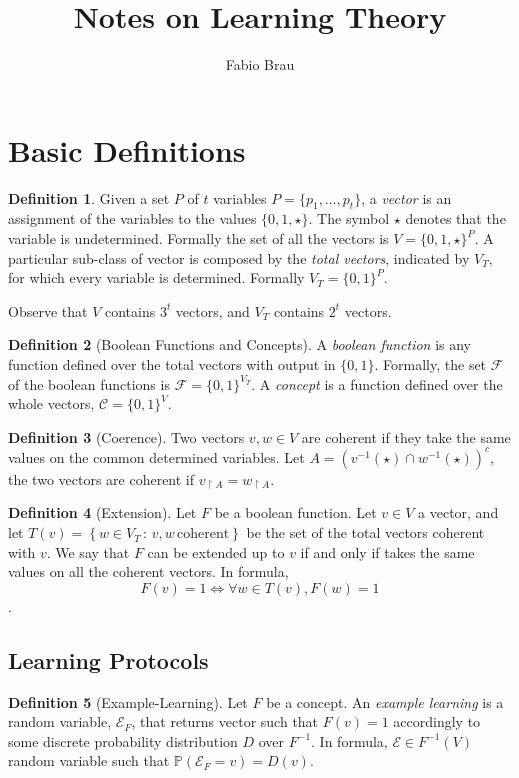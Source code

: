 \documentclass[a4paper,11pt]{article}
\author{Fabio Brau}
\title{Notes on Learning Theory}
\theoremstyle{definition}
\newtheorem{defn}{Definition}
\begin{document}
\maketitle
\tableofcontents
\section{Basic Definitions}
\begin{defn}
  Given a set $P$ of $t$ variables $P=\{p_1,\dots,p_t\}$, a \textit{vector} 
  is an assignment of the variables to the values $\{0,1,\star\}$. The
  symbol $\star$ denotes that the variable is undetermined. Formally the set 
  of all the vectors is $V=\{0,1,\star\}^P$. A particular sub-class of vector 
  is composed by the \textit{total vectors}, indicated by $V_T$, for which every variable is
  determined. Formally $V_T = \{0,1\}^P$.
\end{defn}

Observe that $V$ contains $3^t$ vectors, and $V_T$ contains $2^t$ vectors.

\begin{defn}[Boolean Functions and Concepts]
  A \textit{boolean function} is any function defined over the total vectors
  with output in $\{0,1\}$. Formally, the set $\mathcal{F}$ of the boolean
  functions is $\mathcal{F}=\{0,1\}^{V_T}$. A \textit{concept} is a function
  defined over the whole vectors, $\mathcal{C}=\{0,1\}^{V}$.
\end{defn}

\begin{defn}[Coerence]
  Two vectors $v,w\in V$ are coherent if they take the same values on the
  common determined variables. Let 
  $A = (v^{-1}(\star)\cap w^{-1}(\star))^c$, the two vectors are
  coherent if $v_{\restriction A} = w_{\restriction A}$.
\end{defn}

\begin{defn}[Extension]
  Let $F$ be a boolean function. Let $v\in V$ a vector, and let $T(v)=\left\{
  w\in V_T\,:\, v,w \, \mbox{coherent} \right\}$ be the set of the total vectors
  coherent with $v$. We say that $F$ can be
  extended up to $v$ if and only if takes the same values on all the coherent
  vectors. In formula, 
  \begin{equation}
    F(v) = 1 \iff\forall w\in T(v), F(w)=1
    \label{extension}
  \end{equation}.
\end{defn}

\subsection{Learning Protocols}
\begin{defn}[Example-Learning]
  Let $F$ be a concept. An \textit{example learning} is a random variable, $\mathcal{E}_F$, 
  that returns vector such that $F(v)=1$ accordingly to some discrete
  probability distribution $D$ over $F^{-1}$. In formula, $\mathcal{E} \in F^{-1}(V)$
  random variable such that $\mathbb{P}(\mathcal{E}_F=v)=D(v)$.
\end{defn}
\end{document}
